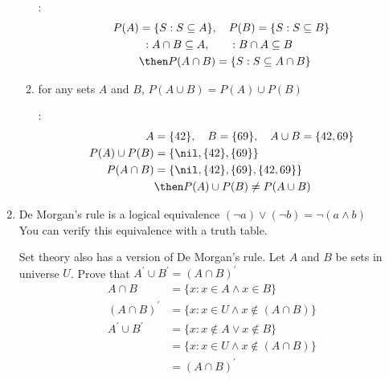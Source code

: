 \documentclass[basic, header]{nosvagor-notes}
\begin{document}
\begin{enumerate}[itemsep=5em]
\begin{enumerate}
          :
          \begin{align*}
            P(A) &= \{ S : S \subseteq A\}, \quad P(B) = \{ S : S \subseteq B \} \\
                 & ~: A \cap B \subseteq A, \qquad  : B \cap A \subseteq B \\
                 & \then P(A \cap B) = \{ S : S \subseteq A \cap B \}
          \end{align*}


        \item for any sets $A$ and $B$, $P(A\cup B) = P(A) \cup P(B)$

          :
          \begin{align*}
            A &= \{42\}, \quad B = \{69\}, \quad A \cup B = \{ 42, 69 \} \\
            P(A) \cup P(B) &= \{\nil, \{ 42 \}, \{ 69 \} \} \\
            P (A \cap B ) &= \{ \nil, \{ 42 \}, \{ 69 \}, \{ 42, 69 \} \} \\
                          &\then P(A) \cup P(B) \neq P(A \cup B)
          \end{align*}


      \end{enumerate}

  \newpage %

    \item De Morgan's rule is a logical equivalence $(\lnot a) \lor (\lnot b) =
      \lnot (a \land b)$\\ You can verify this equivalence with a truth table.

      Set theory also has a version of De Morgan's rule. Let $A$ and $B$ be sets
      in universe $U$. Prove that $A^{'} \cup B^{'} = (A \cap B)^{'}$
      \begin{align*}
        A \cap B &= \{ x : x \in A \land x \in B \} \\
        (A \cap B)^{'}   & = \{ x : x \in U \land x \not\in (A \cap B) \}  \\
        A^{'} \cup B^{'} & = \{ x : x \not\in A \lor x \not\in B \} \\
                         & = \{ x : x \in U \land x \not\in (A \cap B) \} \\
                         & = (A \cap B)^{'}
      \end{align*}

      \vspace{-4em}


\end{enumerate}
\end{document}

